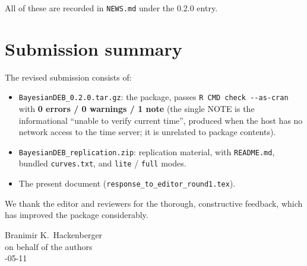 \documentclass[11pt,a4paper]{article}
\newcommand{\code}[1]{\texttt{#1}}
\begin{document}
All of these are recorded in \code{NEWS.md} under the 0.2.0 entry.

\section{Submission summary}

The revised submission consists of:

\begin{itemize}[nosep]
\item \code{BayesianDEB\_0.2.0.tar.gz}: the package, passes
  \verb|R CMD check --as-cran| with \textbf{0 errors / 0 warnings /
  1 note} (the single NOTE is the informational ``unable to verify
  current time'', produced when the host has no network access to
  the time server; it is unrelated to package contents).
\item \code{BayesianDEB\_replication.zip}: replication material,
  with \code{README.md}, bundled \code{curves.txt}, and \code{lite}
  / \code{full} modes.
\item The present document (\code{response\_to\_editor\_round1.tex}).
\end{itemize}

We thank the editor and reviewers for the thorough, constructive
feedback, which has improved the package considerably.

\vspace{1em}
\noindent Branimir K.\ Hackenberger\\
\noindent on behalf of the authors\\
-05-11
\end{document}
